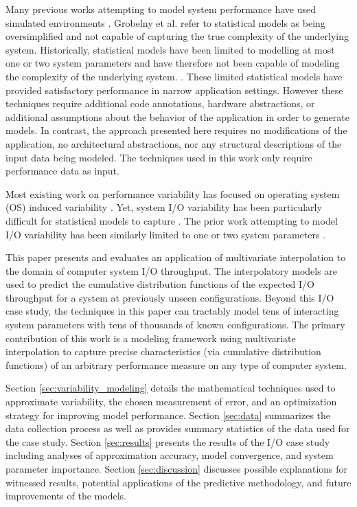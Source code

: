 \documentclass[letterpaper, 10 pt, conference]{ieeeconf}  %
\begin{document}
Many previous works attempting to model system performance have used simulated environments \cite{grobelny2007fase,wang2009simulation,wang2013towards}. Grobelny et al. refer to statistical models as being oversimplified and not capable of capturing the true complexity of the underlying system. Historically, statistical models have been limited to modelling at most one or two system parameters and have therefore not been capable of modeling the complexity of the underlying system. \cite{snavely2002framework,bailey2005performance,barker2009using,ye2010analyzing}. These limited statistical models have provided satisfactory performance in narrow application settings. However these techniques require additional code annotations, hardware abstractions, or additional assumptions about the behavior of the application in order to generate models. In contrast, the approach presented here requires no modifications of the application, no architectural abstractions, nor any structural descriptions of the input data being modeled. The techniques used in this work only require performance data as input.

Most existing work on performance variability has focused on operating system (OS) induced variability \cite{beckman2008benchmarking,de2007identifying}. Yet, system I/O variability has been particularly difficult for statistical models to capture \cite{bailey2005performance}. The prior work attempting to model I/O variability has been similarly limited to one or two system parameters \cite{lofstead2010managing}.

This paper presents and evaluates an application of multivariate interpolation to the domain of computer system I/O throughput. The interpolatory models are used to predict the cumulative distribution functions of the expected I/O throughput for a system at previously unseen configurations. Beyond this I/O case study, the techniques in this paper can tractably model tens of interacting system parameters with tens of thousands of known configurations. The primary contribution of this work is a modeling framework using multivariate interpolation to capture precise characteristics (via cumulative distribution functions) of an arbitrary performance measure on any type of computer system.

Section \ref{sec:variability_modeling} details the mathematical techniques used to approximate variability, the chosen measurement of error, and an optimization strategy for improving model performance. Section \ref{sec:data} summarizes the data collection process as well as provides summary statistics of the data used for the case study. Section \ref{sec:results} presents the results of the I/O case study including analyses of approximation accuracy, model convergence, and system parameter importance. Section \ref{sec:discussion} discusses possible explanations for witnessed results, potential applications of the predictive methodology, and future improvements of the models.
\end{document}
